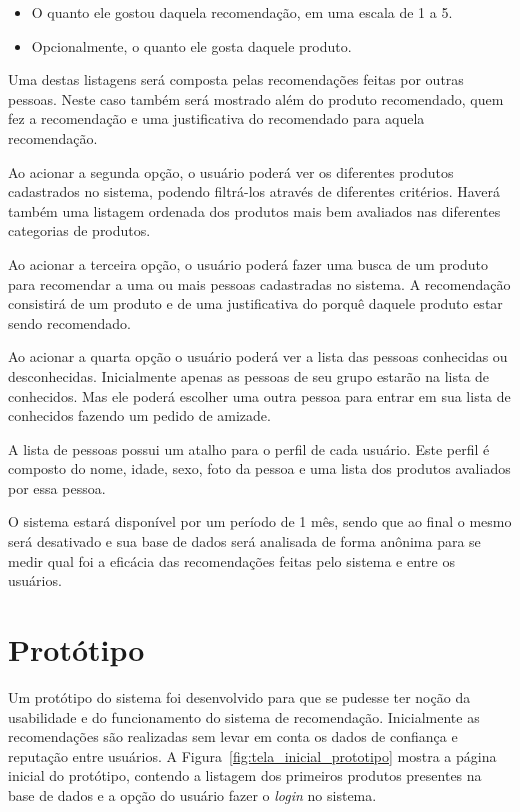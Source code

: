\begin{itemize}
	\item O quanto ele gostou daquela recomendação, em uma escala de 1 a 5.
	\item Opcionalmente, o quanto ele gosta daquele produto.
\end{itemize}

 Uma destas listagens será composta pelas recomendações feitas por outras pessoas. Neste caso também será mostrado além do produto recomendado, quem fez a recomendação e uma justificativa do recomendado para aquela recomendação.

 Ao acionar a segunda opção, o usuário poderá ver os diferentes produtos cadastrados no sistema, podendo filtrá-los através de diferentes critérios. Haverá também uma listagem ordenada dos produtos mais bem avaliados nas diferentes categorias de produtos.

 Ao acionar a terceira opção, o usuário poderá fazer uma busca de um produto para recomendar a uma ou mais pessoas cadastradas no sistema. A recomendação consistirá de um produto e de uma justificativa do porquê daquele produto estar sendo recomendado.

 Ao acionar a quarta opção o usuário poderá ver a lista das pessoas conhecidas ou desconhecidas. Inicialmente apenas as pessoas de seu grupo estarão na lista de conhecidos. Mas ele poderá escolher uma outra pessoa para entrar em sua lista de conhecidos fazendo um pedido de amizade.

 A lista de pessoas possui um atalho para o perfil de cada usuário. Este perfil é composto do nome, idade, sexo, foto da pessoa e uma lista dos produtos avaliados por essa pessoa.

 O sistema estará disponível por um período de 1 mês, sendo que ao final o mesmo será desativado e sua base de dados será analisada de forma anônima para se medir qual foi a eficácia das recomendações feitas pelo sistema e entre os usuários.

 \section{Protótipo}
 \label{cha:prototipo}

 Um protótipo do sistema foi desenvolvido para que se pudesse ter noção da usabilidade e do funcionamento do sistema de recomendação. Inicialmente as recomendações são realizadas sem levar em conta os dados de confiança e reputação entre usuários. A Figura~\ref{fig:tela_inicial_prototipo} mostra a página inicial do protótipo, contendo a listagem dos primeiros produtos presentes na base de dados e a opção do usuário fazer o \textit{login} no sistema.
 
